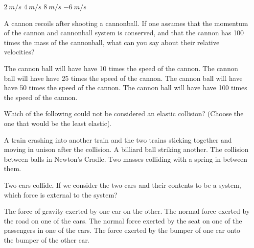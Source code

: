 \begin{checkboxes}
\choice   $\SI{2}{m/s}$
\choice  $\SI{4}{m/s}$
\CorrectChoice $\SI{8}{m/s}$ 
\choice  $\SI{-6}{m/s}$
\end{checkboxes}

\question A cannon recoils after shooting a cannonball. If one assumes that the momentum of the cannon and cannonball system is conserved, and that the cannon has 100 times the mass of the cannonball, what can you say about their relative velocities?
\begin{checkboxes}
\choice The cannon ball will have have 10 times the speed of the cannon.
\choice The cannon ball will have have 25 times the speed of the cannon.
\choice The cannon ball will have have 50 times the speed of the cannon.
\CorrectChoice  The cannon ball will have have 100 times the speed of the cannon.
\end{checkboxes}


\question Which of the following could not be considered an elastic collision? (Choose the one that would be the least elastic).
\begin{checkboxes}
\CorrectChoice A train crashing into another train and the two trains sticking together and moving in unison after the collision.
\choice A billiard ball striking another.
\choice The collision between balls in Newton's Cradle.
\choice Two masses colliding with a spring in between them. 
\end{checkboxes}


\question Two cars collide. If we consider the two cars and their contents to be a system, which force is external to the system?
\begin{checkboxes}
\choice The force of gravity exerted by one car on the other. 
\CorrectChoice The normal force exerted by the road on one of the cars.
\choice The normal force exerted by the seat on one of the passengers in one of the cars.
\choice The force exerted by the bumper of one car onto the bumper of the other car. 
\end{checkboxes}


%
%
